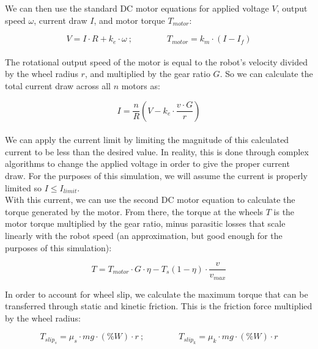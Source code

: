 \documentclass[a4paper]{article}
\begin{document}
	We can then use the standard DC motor equations for applied voltage $ V $, output speed $ \omega $, current draw $ I $, and motor torque $ T_{motor} $:
	
	\begin{equation}
		V = I \cdot R + k_e \cdot \omega\ ; \qquad\qquad
		T_{motor} = k_m \cdot \left( I - I_f \right)
	\end{equation}\\
	
	The rotational output speed of the motor is equal to the robot's velocity divided by the wheel radius $ r $, and multiplied by the gear ratio $ G $. So we can calculate the total current draw across all $ n $ motors as:
	
	\begin{equation}
		I = \frac{n}{R} \left( V - k_e \cdot \frac{v \cdot G}{r} \right)
	\end{equation}\\
	
	We can apply the current limit by limiting the magnitude of this calculated current to be less than the desired value. In reality, this is done through complex algorithms to change the applied voltage in order to give the proper current draw. For the purposes of this simulation, we will assume the current is properly limited so $ I \leq I_{limit} $.\\
	
	With this current, we can use the second DC motor equation to calculate the torque generated by the motor. From there, the torque at the wheels $ T $ is the motor torque multiplied by the gear ratio, minus parasitic losses that scale linearly with the robot speed (an approximation, but good enough for the purposes of this simulation):
	
	\begin{equation}
		T = T_{motor} \cdot G \cdot \eta - T_s \left( 1 - \eta \right) \cdot \frac{v}{v_{max}}
	\end{equation}
	
	In order to account for wheel slip, we calculate the maximum torque that can be transferred through static and kinetic friction. This is the friction force multiplied by the wheel radius:
	
	\begin{equation}
		T_{slip_s} = \mu_s \cdot mg \cdot \left( \% W \right) \cdot r\ ; \qquad\qquad
		T_{slip_k} = \mu_k \cdot mg \cdot \left( \% W \right) \cdot r
	\end{equation}\\
	
\end{document}
